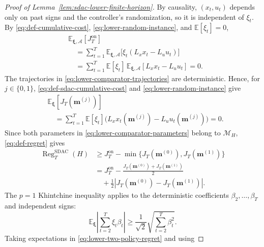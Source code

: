 \documentclass[journal]{IEEEtran}
\theoremstyle{remark}
\newcommand{\RegSDAC}[1]{\operatorname{Reg}_{#1}^{\mathrm{SDAC}}}
\begin{document}
\begin{proof}[Proof of Lemma~\ref{lem:sdac-lower-finite-horizon}]
By causality, $(x_t,u_t)$ depends only on past signs and the controller's
randomization, so it is independent of $\xi_t$. By
\eqref{eq:def-cumulative-cost}, \eqref{eq:lower-random-instance}, and
$\mathbb{E}[\xi_t]=0$,
\begin{equation}
\label{eq:lower-online-zero-mean}
\begin{aligned}
&\mathbb{E}_{\boldsymbol{\xi},\mathcal{A}}[J_T^{\mathrm{on}}]\\
&\quad=\sum_{t=1}^T
\mathbb{E}_{\boldsymbol{\xi},\mathcal{A}}
\bigl[\xi_t(L_xx_t-L_uu_t)\bigr]\\
&\quad=\sum_{t=1}^T
\mathbb{E}[\xi_t]\,
\mathbb{E}_{\boldsymbol{\xi},\mathcal{A}}[L_xx_t-L_uu_t]
=0.
\end{aligned}
\end{equation}
The trajectories in \eqref{eq:lower-comparator-trajectories} are
deterministic. Hence, for $j\in\{0,1\}$,
\eqref{eq:def-sdac-cumulative-cost} and \eqref{eq:lower-random-instance} give
\begin{equation}
\label{eq:lower-sdac-zero-mean}
\begin{aligned}
&\mathbb{E}_{\boldsymbol{\xi}}[J_T(\mathbf{m}^{(j)})]\\
&\quad=\sum_{t=1}^T\mathbb{E}[\xi_t]
\bigl(L_xx_t(\mathbf{m}^{(j)})-L_uu_t(\mathbf{m}^{(j)})\bigr)
=0.
\end{aligned}
\end{equation}
Since both parameters in \eqref{eq:lower-comparator-parameters} belong to
$\mathcal{M}_H$, \eqref{eq:def-regret} gives
\begin{equation}
\label{eq:lower-two-policy-regret}
\begin{aligned}
\RegSDAC{T}(H)
&\ge J_T^{\mathrm{on}}
-\min\{J_T(\mathbf{m}^{(0)}),J_T(\mathbf{m}^{(1)})\}\\
&=J_T^{\mathrm{on}}
-\frac{J_T(\mathbf{m}^{(0)})+J_T(\mathbf{m}^{(1)})}{2}\\
&\quad+\frac12
\left|J_T(\mathbf{m}^{(0)})-J_T(\mathbf{m}^{(1)})\right|.
\end{aligned}
\end{equation}
The $p=1$ Khintchine inequality \cite{szarek1976best} applies to the
deterministic coefficients $\beta_2,\ldots,\beta_T$ and independent signs:
\begin{equation}
\label{eq:lower-khintchine}
\mathbb{E}_{\boldsymbol{\xi}}
\left|\sum_{t=2}^T\xi_t\beta_t\right|
\ge\frac{1}{\sqrt2}\sqrt{\sum_{t=2}^T\beta_t^2}.
\end{equation}
Taking expectations in \eqref{eq:lower-two-policy-regret} and using

\end{proof}
\end{document}
